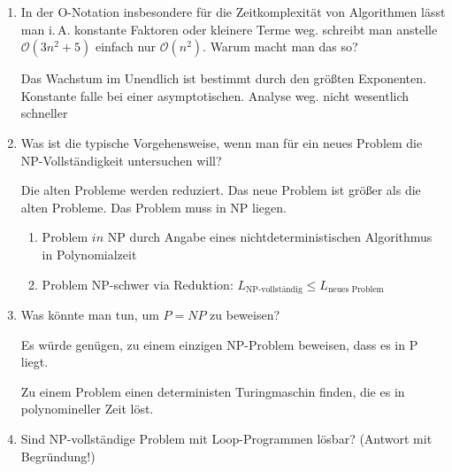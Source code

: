 \documentclass{bschlangaul-aufgabe}
\begin{document}
\begin{enumerate}



\item In der O-Notation insbesondere für die Zeitkomplexität von
Algorithmen lässt man i.\,A. konstante Faktoren oder kleinere Terme weg.
\ZB schreibt man anstelle $\mathcal{O}(3n^2 + 5)$ einfach nur
$\mathcal{O}(n^2)$. Warum macht man das so?

\begin{bAntwort}
Das Wachstum im Unendlich ist bestimmt durch den größten Exponenten.
Konstante falle bei einer asymptotischen. Analyse weg. nicht wesentlich
schneller
\end{bAntwort}



\item Was ist die typische Vorgehensweise, wenn man für ein neues
Problem die NP-Vollständigkeit untersuchen will?

\begin{bAntwort}
Die alten Probleme werden reduziert. Das neue Problem ist größer als die
alten Probleme. Das Problem muss in NP liegen.

\begin{enumerate}
\item Problem $in$ NP durch Angabe eines nichtdeterministischen
Algorithmus in Polynomialzeit

\item Problem NP-schwer via Reduktion: $L_{\text{NP-vollständig}} \leq
L_{\text{neues Problem}}$
\end{enumerate}
\end{bAntwort}



\item Was könnte man tun, um $P = NP$ zu beweisen?

\begin{bAntwort}
Es würde genügen, zu einem einzigen NP-Problem beweisen, dass es in P
liegt.

Zu einem Problem einen deterministen Turingmaschin finden, die es
in polynomineller Zeit löst.
\end{bAntwort}



\item Sind NP-vollständige Problem mit Loop-Programmen lösbar? (Antwort
mit Begründung!)


\end{enumerate}
\end{document}
